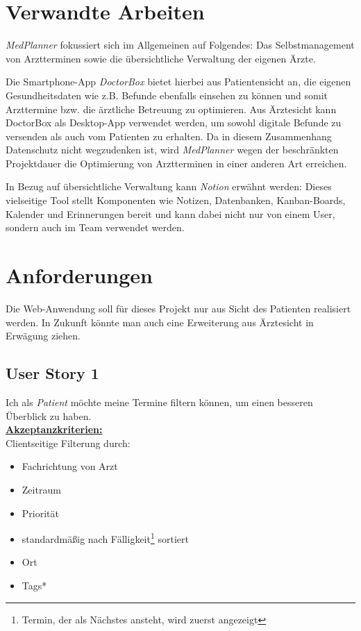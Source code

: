 \documentclass[conference]{IEEEtran}
\begin{document}
\section{Verwandte Arbeiten}
\textit{MedPlanner} fokussiert sich im Allgemeinen auf Folgendes: Das Selbstmanagement von Arztterminen sowie die übersichtliche Verwaltung der eigenen Ärzte.

Die Smartphone-App \textit{DoctorBox}\cite{docBox} bietet hierbei aus Patientensicht an, die eigenen Gesundheitsdaten wie z.B. Befunde ebenfalls einsehen zu können und somit Arzttermine bzw. die ärztliche Betreuung zu optimieren. Aus Ärztesicht kann DoctorBox als Desktop-App verwendet werden, um sowohl digitale Befunde zu versenden als auch vom Patienten zu erhalten. Da in diesem Zusammenhang Datenschutz nicht wegzudenken ist, wird \textit{MedPlanner} wegen der beschränkten Projektdauer die Optimierung von Arztterminen in einer anderen Art erreichen.

In Bezug auf übersichtliche Verwaltung kann \textit{Notion}\cite{notion} erwähnt werden: Dieses vielseitige Tool stellt Komponenten wie Notizen, Datenbanken, Kanban-Boards, Kalender und Erinnerungen bereit und kann dabei nicht nur von einem User, sondern auch im Team verwendet werden.

\section{Anforderungen}
Die Web-Anwendung soll für dieses Projekt nur aus Sicht des Patienten realisiert werden. In Zukunft könnte man auch eine Erweiterung aus Ärztesicht in Erwägung ziehen.

\subsection{User Story 1}
Ich als \textit{Patient} möchte meine Termine filtern können, um einen besseren Überblick zu haben.\\
\underline{\textbf{Akzeptanzkriterien:}}\\
Clientseitige Filterung durch:
\begin{itemize}
	\item Fachrichtung von Arzt
	\item Zeitraum
	\item Priorität
	\item standardmäßig nach Fälligkeit\footnote{Termin, der als Nächstes ansteht, wird zuerst angezeigt} sortiert
	\item Ort
	\item Tags* 
\end{itemize}
\end{document}
